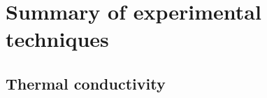 









\iffalse
\section{Summary of experimental techniques}

\subsection{Thermal conductivity}

